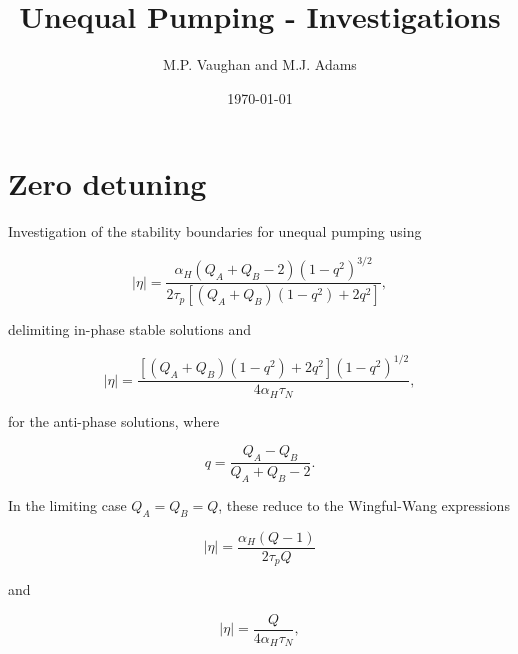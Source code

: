 \documentclass[a4paper,12pt]{article}
\renewcommand{\mod}[1]{\left|#1\right|}
\begin{document}
\title{Unequal Pumping - Investigations}

\author{M.P. Vaughan and M.J. Adams}

\date{\today}

\maketitle

\section{Zero detuning}

Investigation of the stability boundaries for unequal pumping using

\begin{equation}
\mod{\eta} = \frac{\alpha_{H}\left(Q_{A} + Q_{B} - 2\right)\left(1-q^{2}\right)^{3/2}}{2\tau_{p}\left[\left(Q_{A}+Q_{B}\right)\left(1 - q^{2}\right) + 2q^{2}\right]}, \label{eq:inphase}
\end{equation}

\noindent delimiting in-phase stable solutions and 

\begin{equation}
\mod{\eta} = \frac{\left[\left(Q_{A} + Q_{B}\right)\left(1 - q^{2}\right) + 2q^{2}\right]\left(1-q^{2}\right)^{1/2}}{4\alpha_{H}\tau_{N}}, \label{eq:antiphase}
\end{equation}

\noindent for the anti-phase solutions, where

\begin{equation}
q = \frac{Q_{A} - Q_{B}}{Q_{A} + Q_{B} -2}. \nonumber
\end{equation}

\noindent In the limiting case $Q_{A} = Q_{B} = Q$, these reduce to the Wingful-Wang expressions

\begin{equation}
\mod{\eta} = \frac{\alpha_{H}\left(Q-1\right)}{2\tau_{p}Q} \label{eq:WW_inphase}
\end{equation}

\noindent and 

\begin{equation}
\mod{\eta} = \frac{Q}{4\alpha_{H}\tau_{N}}, \label{eq:WW_antiphase}
\end{equation}
\end{document}
